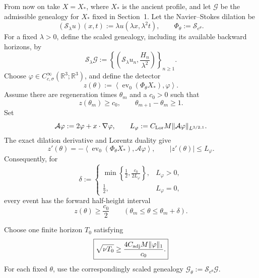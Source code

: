 \documentclass[11pt]{article}
\newcommand{\R}{\mathbb R}
\newcommand{\cG}{\mathcal G}
\newcommand{\cS}{\mathcal S}
\newcommand{\ev}{\operatorname{ev}}
\newcommand{\LorentzDual}{L^{3/2,1}}
\begin{document}
From now on take \(X=X_*\), where \(X_*\) is the ancient profile, and let
\(\cG\) be the admissible genealogy for \(X_*\) fixed in Section~1.  Let
the Navier--Stokes dilation be
\[
  (\cS_\lambda u)(x,t)
  :=\lambda u(\lambda x,\lambda^2t),
  \qquad
  \Phi_\theta:=\cS_{e^\theta}.
\]
For a fixed \(\lambda>0\), define the scaled genealogy, including its
available backward horizons, by
\begin{equation}
  \cS_\lambda\cG
  :=
  \left\{
    \left(\cS_\lambda u_n,\frac{H_n}{\lambda^2}\right)
  \right\}_{n\ge1}.
  \label{eq:scaled-genealogy}
\end{equation}
Choose
\(\varphi\in C^\infty_{c,\sigma}(\R^3;\R^3)\), and define the detector
\begin{equation}
  z(\theta)
  :=
  \left\langle
    \ev_0(\Phi_\theta X_*),\varphi
  \right\rangle .
  \label{eq:observable}
\end{equation}
Assume there are regeneration times \(\theta_m\) and a \(c_0>0\) such
that
\[
  z(\theta_m)\ge c_0,
  \qquad
  \theta_{m+1}-\theta_m\ge1.
\]
Set
\[
  \mathcal A\varphi:=2\varphi+x\cdot\nabla\varphi,
  \qquad
  L_\varphi
  :=C_{\rm Lor}M
    \|\mathcal A\varphi\|_{\LorentzDual}.
\]
The exact dilation derivative and Lorentz duality give
\[
  z'(\theta)
  =-\left\langle
      \ev_0(\Phi_\theta X_*),\mathcal A\varphi
    \right\rangle,
  \qquad
  |z'(\theta)|\le L_\varphi.
\]
Consequently, for
\begin{equation}
  \delta
  :=
  \begin{cases}
    \displaystyle
    \min\left\{\frac12,\frac{c_0}{2L_\varphi}\right\},
      &L_\varphi>0,\\[6pt]
    \displaystyle\frac12,&L_\varphi=0,
  \end{cases}
  \label{eq:delta}
\end{equation}
every event has the forward half-height interval
\begin{equation}
  z(\theta)\ge\frac{c_0}{2}
  \qquad
  (\theta_m\le\theta\le\theta_m+\delta).
  \label{eq:persistence}
\end{equation}

Choose one finite horizon \(T_0\) satisfying
\begin{equation}
  \boxed{
  \sqrt{\nu T_0}
  \ge
  \frac{4C_{\rm adj}M\|\varphi\|_1}{c_0}.}
  \label{eq:horizon}
\end{equation}
For each fixed \(\theta\), use the correspondingly scaled genealogy
\(\cG_\theta:=\cS_{e^\theta}\cG\).
\end{document}

